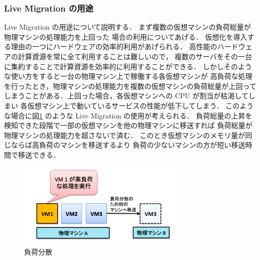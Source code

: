 \documentclass[graduation-thesis]{mlarticle}
\begin{document}
\subsubsection{Live Migration の用途}
\label{sec-2-3-2}
Live Migration の用途について説明する．
まず複数の仮想マシンの負荷総量が物理マシンの処理能力を上回った
場合の利用についてあげる．
仮想化を導入する理由の一つにハードウェアの効率的利用があげられる．
高性能のハードウェアの計算資源を常に全て利用することは難しいので，
複数のサーバをその一台に集約することで計算資源を効率的に利用することができる．
しかしそのような使い方をすると一台の物理マシン上で稼働する各仮想マシンが
高負荷な処理を行ったとき，物理マシンの処理能力を複数の仮想マシンの負荷総量が上回って
しまうことがある．上回った場合，各仮想マシンへの CPU が割当が枯渇してしまい
各仮想マシン上で動いているサービスの性能が低下してしまう．
このような場合に図\ref{dispersion} のような Live Migration の使用が考えられる．
負荷総量の上昇を検知できた段階で一部の仮想マシンを他の物理マシンに移送すれば
負荷総量が物理マシンの処理能力を超さないで済む．
このとき仮想マシンのメモリ量が同じならば高負荷のマシンを移送するより
負荷の少ないマシンの方が短い移送時間で移送できる．
\begin{figure}[H]\begin{center}\includegraphics[width=8.0cm]{./img/dispersion.png}\caption{ 負荷分散}\label{dispersion}\end{center}\end{figure}
\end{document}
